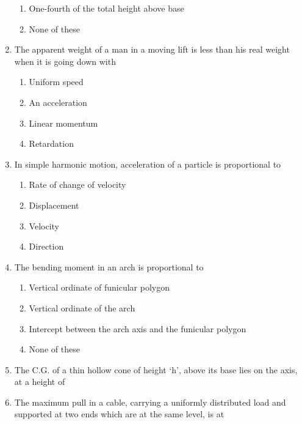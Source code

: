 \documentclass[11pt,a4paper]{article}
\begin{document}
\begin{enumerate}
\begin{enumerate}[label=\Alph*.]
\item{One-fourth of the total height above base}
\item{None of these}
\end{enumerate}
\item{The apparent weight of a man in a moving lift is less than his real weight when it is going down with}
\begin{enumerate}[label=\Alph*.]
\item{Uniform speed}
\item{An acceleration}
\item{Linear momentum}
\item{Retardation}
\end{enumerate}
\item{In simple harmonic motion, acceleration of a particle is proportional to}
\begin{enumerate}[label=\Alph*.]
\item{Rate of change of velocity}
\item{Displacement}
\item{Velocity}
\item{Direction}
\end{enumerate}
\item{The bending moment in an arch is proportional to}
\begin{enumerate}[label=\Alph*.]
\item{Vertical ordinate of funicular polygon}
\item{Vertical ordinate of the arch}
\item{Intercept between the arch axis and the funicular polygon}
\item{None of these}
\end{enumerate}
\item{The C.G. of a thin hollow cone of height `h', above its base lies on the axis, at a height of
}
\\
\item{The maximum pull in a cable, carrying a uniformly distributed load and supported at two ends which are at the same level, is at}
\begin{enumerate}[label=\Alph*.]

\end{enumerate}
\end{enumerate}
\end{document}
